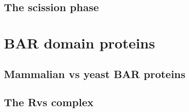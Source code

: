 		\subsection{The scission phase}
		
		
		
	\section{BAR domain proteins }
		\subsection{Mammalian vs yeast BAR proteins}
		\subsection{The Rvs complex}		
		
		
	
